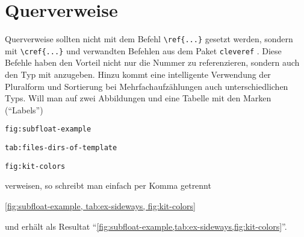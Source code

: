 \section{Querverweise}%
\label{sec:Querverweise}
%
Querverweise sollten nicht mit dem Befehl \verb#\ref{...}# gesetzt werden,
sondern mit \verb#\cref{...}# und verwandten Befehlen aus dem Paket
\texttt{cleveref} \cite{Cubitt2013}.
Diese Befehle haben den Vorteil nicht nur die Nummer zu referenzieren,
sondern auch den Typ mit anzugeben.
Hinzu kommt eine intelligente Verwendung der Pluralform und
Sortierung bei Mehrfachaufzählungen auch unterschiedlichen Typs.
Will man \bspw auf zwei Abbildungen und eine Tabelle mit den Marken (\enquote{Labels})
%
\begin{itemize*}
\item \texttt{fig:subfloat-example}
\item \texttt{tab:files-dirs-of-template}
\item \texttt{fig:kit-colors}
\end{itemize*}
%
verweisen, so schreibt man einfach per Komma getrennt
%
\begin{latex}[caption={Cleveres Referenzieren mit \bs cref},label={lst:cref}]
\cref{fig:subfloat-example,
      tab:ex-sideways,
      fig:kit-colors}
\end{latex}
%
und erhält als Resultat
\enquote{\cref{fig:subfloat-example,tab:ex-sideways,fig:kit-colors}}.